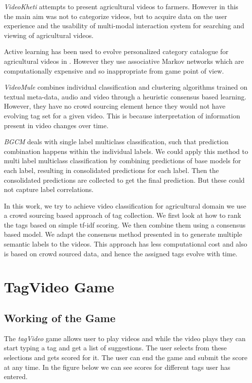 \documentclass[12pt]{report}
\begin{document}
\emph{VideoKheti}\cite{videoKheti} attempts to present agricultural videos to farmers. However in this the main aim was not to categorize videos, but to acquire data on the user experience and the usability of multi-modal interaction system for searching and viewing of agricultural videos.

Active learning has been used to evolve personalized category catalogue for agricultural videos in \cite{AMN}. However they use associative Markov networks which are computationally expensive and so inappropriate from game point of view. 

\emph{VideoMule}\cite{videoMule} combines individual classification and clustering algorithms trained on textual meta-data, audio and video through a heuristic consensus based learning. However, they have no crowd sourcing element hence they would not have evolving tag set for a given video. This is because interpretation of information present in video changes over time.

\emph{BGCM}\cite{BGCM} deals with single label multiclass classification, such that prediction combination happens within the individual labels. We could apply this method to multi label multiclass classification by combining predictions of base models for each label, resulting in consolidated predictions for each label. Then the consolidated predictions are collected to get the final prediction. But these could not capture label correlations.
 
In this work, we try to achieve video classification for agricultural domain we use a crowd sourcing based approach of tag collection. We first look at how to rank the tags based on simple tf-idf scoring. We then combine them using a consensus based model. We adapt the consensus method presented in \cite{MLCM} to generate multiple semantic labels to the videos. This approach has less computational cost and also is based on crowd sourced data, and hence the assigned tags evolve with time. 
 
\chapter{TagVideo Game}
\section{Working of the Game}
The \emph{tagVideo} game allows user to play videos and while the video plays they can start typing a tag and get a list of suggestions. The user selects from these selections and gets scored for it. The user can end the game and submit the score at any time. In the figure below we can see scores for different tags user has entered.
\end{document}
